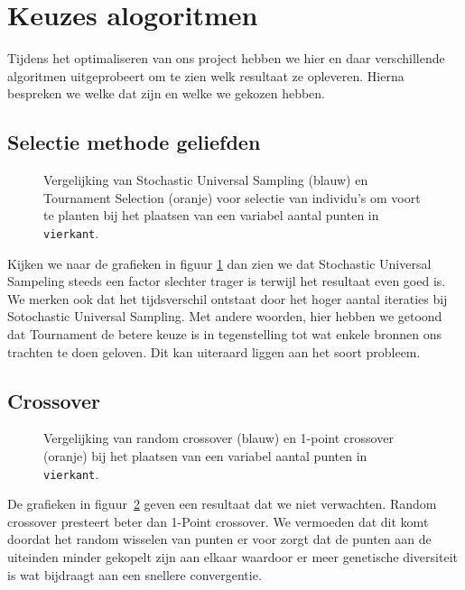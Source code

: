 \section{Keuzes alogoritmen}
Tijdens het optimaliseren van ons project hebben we hier en daar verschillende algoritmen uitgeprobeert om te zien welk resultaat ze opleveren. Hierna bespreken we welke dat zijn en welke we gekozen hebben.
\subsection{Selectie methode geliefden}
\label{sub:algLoverSelection}


\begin{figure}[H]
\caption{Vergelijking van Stochastic Universal Sampling (blauw) en Tournament Selection (oranje) voor selectie van individu's om voort te planten bij het plaatsen van een variabel aantal punten in \texttt{vierkant}.}
\label{graf:algLoverSelection}
\end{figure}
Kijken we naar de grafieken in figuur \ref{graf:algLoverSelection} dan zien we dat Stochastic Universal Sampeling steeds een factor slechter trager is terwijl het resultaat even goed is. We merken ook dat het tijdsverschil ontstaat door het hoger aantal iteraties bij Sotochastic Universal Sampling. Met andere woorden, hier hebben we getoond dat Tournament de betere keuze is in tegenstelling tot wat enkele bronnen ons trachten te doen geloven. Dit kan uiteraard liggen aan het soort probleem.


\subsection{Crossover}
\label{ssub:crossover_type}


\begin{figure}[H]
\caption{Vergelijking van random crossover (blauw) en 1-point crossover (oranje) bij het plaatsen van een variabel aantal punten in \texttt{vierkant}.}
\label{graf:algCrossover}
\end{figure}

De grafieken in figuur~\ref{graf:algCrossover} geven een resultaat dat we niet verwachten. Random crossover presteert beter dan 1-Point crossover. We vermoeden dat dit komt doordat het random wisselen van punten er voor zorgt dat de punten aan de uiteinden minder gekopelt zijn aan elkaar waardoor er meer genetische diversiteit is wat bijdraagt aan een snellere convergentie. 